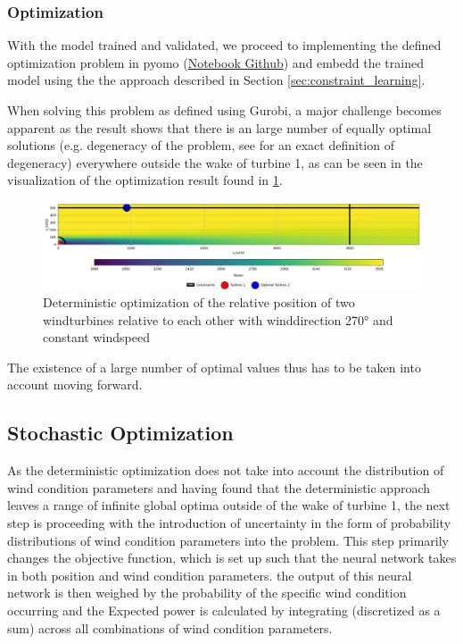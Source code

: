 \subsubsection{Optimization}


With the model trained and validated, we proceed to implementing the defined optimization problem in pyomo  (\href{https://github.com/schmeti/uc3m_TFM_wind_farm_optimization_codebase/blob/main/Windfarm_power_modelling/0_two_turbine_problem_constrLearn_determin.ipynb}{Notebook Github}) and embedd the trained model using the the approach described in Section \ref{sec:constraint_learning}.

When solving this problem as defined using Gurobi, a major challenge becomes apparent as the result shows that there is an large number of equally optimal solutions (e.g. degeneracy of the problem, see  \cite{vanderbei2020chapter3} for an exact definition of degeneracy) everywhere outside the wake of turbine 1, as can be seen  in the visualization of the optimization result found in \ref{fig:two_turbine_heatmap_degeneracy}.


\begin{figure}[h] 
	\centering
	\includegraphics[width=1\textwidth]{figures/optimization/opti_determ270.png} 
	\caption{Deterministic optimization of the relative position of two windturbines relative to each other with winddirection 270° and constant windspeed}
	\label{fig:two_turbine_heatmap_degeneracy}
\end{figure}

The existence of a large number of optimal values thus has to be taken into account moving forward.


\subsection{Stochastic Optimization}

As the deterministic optimization does not take into account the distribution of wind condition parameters and having found that the deterministic approach leaves a range of infinite global optima outside of the wake of turbine 1, the next step is proceeding with the introduction of uncertainty in the form of probability distributions of wind condition parameters into the problem. This step primarily changes the objective function, which is set up such that the neural network takes in both position and wind condition parameters. the output of this neural network is then weighed by the probability of the specific wind condition occurring and the Expected power is calculated by integrating (discretized as a sum) across all combinations of wind condition parameters.

